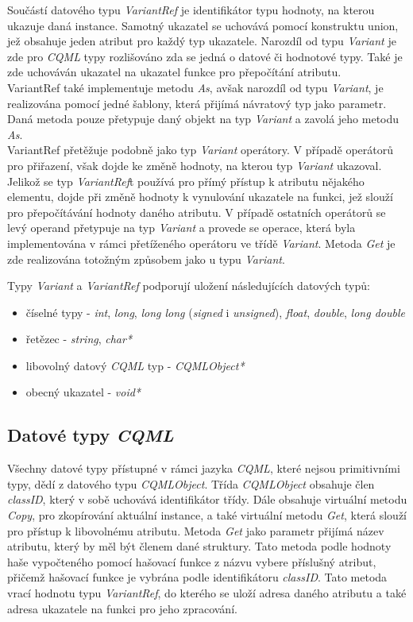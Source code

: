 \documentclass[11pt,twoside,a4paper]{book}
\begin{document}
Součástí datového typu \textit{VariantRef} je identifikátor typu hodnoty, na kterou ukazuje daná instance. Samotný ukazatel se uchovává pomocí konstruktu union, jež obsahuje jeden atribut pro každý typ ukazatele. Narozdíl od typu \textit{Variant} je zde pro \textit{CQML} typy rozlišováno zda se jedná o datové či hodnotové typy. Také je zde uchováván ukazatel na ukazatel funkce pro přepočítání atributu.\\
VariantRef také implementuje metodu \textit{As}, avšak narozdíl od typu \textit{Variant}, je realizována pomocí jedné šablony, která přijímá návratový typ jako parametr. Daná metoda pouze přetypuje daný objekt na typ \textit{Variant} a zavolá jeho metodu \textit{As}.\\
VariantRef přetěžuje podobně jako typ \textit{Variant} operátory. V případě operátorů pro přiřazení, však dojde ke změně hodnoty, na kterou typ \textit{Variant} ukazoval. Jelikož se typ \textit{VariantRef}t používá pro přímý přístup k atributu nějakého elementu, dojde při změně hodnoty k vynulování ukazatele na funkci, jež slouží pro přepočítávání hodnoty daného atributu. V případě ostatních operátorů se levý operand přetypuje na typ \textit{Variant} a provede se operace, která byla implementována v rámci přetíženého operátoru ve třídě \textit{Variant}. Metoda \textit{Get} je zde realizována totožným způsobem jako u typu \textit{Variant}.

Typy \textit{Variant} a \textit{VariantRef} podporují uložení následujících datových typů:
\begin{itemize}
\item číselné typy - \textit{int}, \textit{long}, \textit{long long} (\textit{signed} i \textit{unsigned}), \textit{float}, \textit{double}, \textit{long double}
\item řetězec - \textit{string}, \textit{char*}
\item libovolný datový \textit{CQML} typ - \textit{CQMLObject*}
\item obecný ukazatel - \textit{void*}
\end{itemize}

\subsection{Datové typy \textit{CQML}}
Všechny datové typy přístupné v rámci jazyka \textit{CQML}, které nejsou primitivními typy, dědí z datového typu \textit{CQMLObject}. Třída \textit{CQMLObject} obsahuje člen \textit{classID}, který v sobě uchovává identifikátor třídy. Dále obsahuje virtuální metodu \textit{Copy}, pro zkopírování aktuální instance, a také virtuální metodu \textit{Get}, která slouží pro přístup k libovolnému atributu. Metoda \textit{Get} jako parametr přijímá název atributu, který by měl být členem dané struktury. Tato metoda podle hodnoty haše vypočteného pomocí hašovací funkce z názvu vybere příslušný atribut, přičemž hašovací funkce je vybrána podle identifikátoru \textit{classID}. Tato metoda vrací hodnotu typu \textit{VariantRef}, do kterého se uloží adresa daného atributu a také adresa ukazatele na funkci pro jeho zpracování.\\
\end{document}
